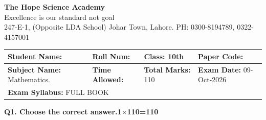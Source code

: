 \documentclass[11pt,a4paper]{article}
\begin{document}
\begin{center}
  {\Huge\bfseries The Hope Science Academy}\\[3pt]
  {\small Excellence is our standard not goal}\\[2pt]
  {\small 247-E-1, (Opposite LDA School) Johar Town, Lahore. PH: 0300-8194789, 0322-4157001}
\end{center}
\medskip\noindent
\begin{tabularx}{\linewidth}{|X|X|X|X|}
\hline
\textbf{Student Name:} & \textbf{Roll Num:} & \textbf{Class:} 10th & \textbf{Paper Code:} \\ \hline
\textbf{Subject Name:} Mathematics. & \textbf{Time Allowed:} & \textbf{Total Marks:} 110 & \textbf{Exam Date:} 09-Oct-2026 \\ \hline
\multicolumn{4}{|l|}{\textbf{Exam Syllabus:} FULL BOOK} \\ \hline
\end{tabularx}
\bigskip
\noindent\textbf{Q1. Choose the correct answer.}\hfill\textbf{1$\times$110=110}
\end{document}
